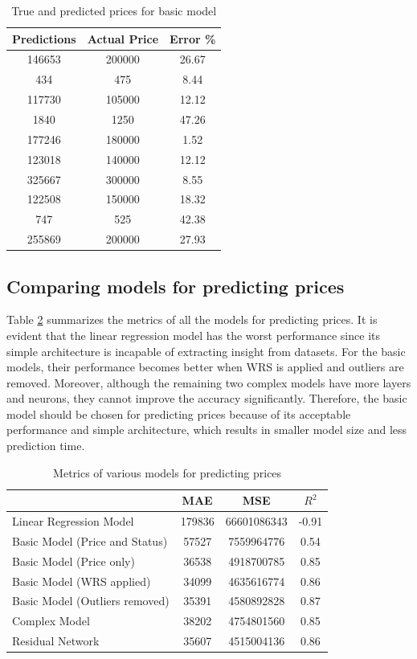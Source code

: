 \documentclass[12pt,twoside]{report}
\begin{document}
\begin{table}[!htbp]
	\centering
	\caption{ True and predicted prices for basic model}
	\label{resnet_prediction_price}
	\begin{tabular}{| c | c | c |}
		\hline
		Predictions & Actual Price & Error \% \\
		\hline
		146653 & 200000 & 26.67 \\
		\hline
		434 & 475 & 8.44 \\
		\hline
		117730 & 105000 & 12.12 \\
		\hline
		1840 & 1250 & 47.26 \\
		\hline
		177246 & 180000 & 1.52 \\
		\hline
		123018 & 140000 & 12.12 \\
		\hline
		325667 & 300000 & 8.55 \\ 
		\hline
		122508 & 150000 & 18.32 \\
		\hline
		747 & 525 & 42.38 \\
		\hline
		255869 & 200000 & 27.93 \\
		\hline
	\end{tabular}
\end{table}

\subsection{Comparing models for predicting prices}
Table \ref{metrics_basic_model} summarizes the metrics of all the models for predicting prices. It is evident that the linear regression model has the worst performance since its simple architecture is incapable of extracting insight from datasets. For the basic models, their performance becomes better when WRS is applied and outliers are removed. Moreover, although the remaining two complex models have more layers and neurons, they cannot improve the accuracy significantly. Therefore, the basic model should be chosen for predicting prices because of its acceptable performance and simple architecture, which results in smaller model size and less prediction time. 
\begin{table}[!htbp]
	\centering
	\caption{Metrics of various models for predicting prices}
	\label{metrics_basic_model}
	\begin{tabular}{| l | c | c | c |}
		\hline
		& MAE & MSE & $R^2$ \\
		\hline
		Linear Regression Model & 179836 & 66601086343 & -0.91 \\
		\hline
		Basic Model (Price and Status) & 57527 & 7559964776 & 0.54 \\
		\hline
		Basic Model (Price only) & 36538 & 4918700785 & 0.85 \\
		\hline
		Basic Model (WRS applied)& 34099 & 4635616774 & 0.86 \\
		\hline
		Basic Model (Outliers removed) & 35391 & 4580892828 & 0.87 \\
		\hline
		Complex Model & 38202 & 4754801560 & 0.85 \\
		\hline
		Residual Network & 35607 & 4515004136 & 0.86 \\
		\hline
	\end{tabular}
\end{table}
\end{document}
